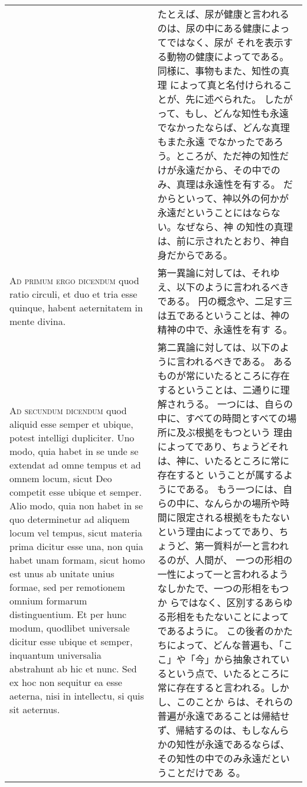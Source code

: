\documentclass[10pt]{jsarticle} %
\begin{document}
\begin{longtable}{p{21em}p{21em}}
&

たとえば、尿が健康と言われるのは、尿の中にある健康によってではなく、尿が
 それを表示する動物の健康によってである。同様に、事物もまた、知性の真理
 によって真と名付けられることが、先に述べられた。
したがって、もし、どんな知性も永遠でなかったならば、どんな真理もまた永遠
 でなかったであろう。ところが、ただ神の知性だけが永遠だから、その中での
 み、真理は永遠性を有する。
だからといって、神以外の何かが永遠だということにはならない。なぜなら、神
 の知性の真理は、前に示されたとおり、神自身だからである。

\\


{\scshape Ad primum ergo dicendum} quod ratio
 circuli, et duo et tria esse quinque, habent aeternitatem in mente
 divina.


&

第一異論に対しては、それゆえ、以下のように言われるべきである。
円の概念や、二足す三は五であるということは、神の精神の中で、永遠性を有す
 る。


\\



{\scshape Ad secundum dicendum} quod aliquid
 esse semper et ubique, potest intelligi dupliciter. Uno modo, quia
 habet in se unde se extendat ad omne tempus et ad omnem locum, sicut
 Deo competit esse ubique et semper. Alio modo, quia non habet in se quo
 determinetur ad aliquem locum vel tempus, sicut materia prima dicitur
 esse una, non quia habet unam formam, sicut homo est unus ab unitate
 unius formae, sed per remotionem omnium formarum distinguentium. Et per
 hunc modum, quodlibet universale dicitur esse ubique et semper,
 inquantum universalia abstrahunt ab hic et nunc. Sed ex hoc non
 sequitur ea esse aeterna, nisi in intellectu, si quis sit aeternus.

&


第二異論に対しては、以下のように言われるべきである。
あるものが常にいたるところに存在するということは、二通りに理解されうる。
 一つには、自らの中に、すべての時間とすべての場所に及ぶ根拠をもつという
 理由によってであり、ちょうどそれは、神に、いたるところに常に存在すると
 いうことが属するようにである。
もう一つには、自らの中に、なんらかの場所や時間に限定される根拠をもたない
 という理由によってであり、ちょうど、第一質料が一と言われるのが、人間が、
 一つの形相の一性によって一と言われるようなしかたで、一つの形相をもつか
 らではなく、区別するあらゆる形相をもたないことによってであるように。
この後者のかたちによって、どんな普遍も、「ここ」や「今」から抽象されてい
 るという点で、いたるところに常に存在すると言われる。しかし、このことか
 らは、それらの普遍が永遠であることは帰結せず、帰結するのは、もしなんら
 かの知性が永遠であるならば、その知性の中でのみ永遠だということだけであ
 る。



\end{longtable}
\end{document}
